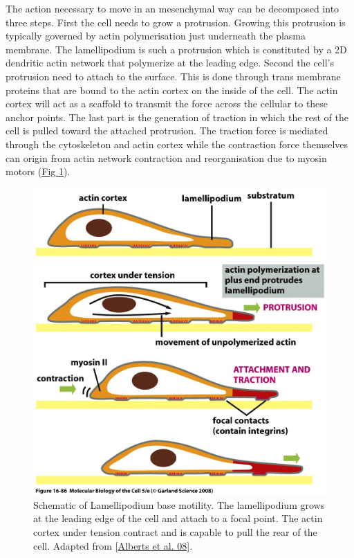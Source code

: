 \documentclass[A4paperpaper,11pt,english]{sphinxmanual}
\begin{document}
The action necessary to move in an mesenchymal way can be decomposed into three
steps. First the cell needs to grow a protrusion. Growing this protrusion is
typically governed by actin polymerisation just underneath the plasma membrane. The
lamellipodium is such a protrusion which is constituted by a 2D dendritic actin network
that polymerize at the leading edge. Second the cell's protrusion
need to attach to the surface. This is done through trans membrane proteins
that are bound to the actin cortex on the inside of the cell. The actin cortex
will act as a scaffold to transmit the force across the cellular to these
anchor points. The last part is the generation of traction in which the rest of the cell is pulled
toward the attached protrusion. The traction force is mediated through the
cytoskeleton and actin cortex while the contraction force themselves can origin
from actin network contraction and reorganisation due to myosin motors (\hyperref[index-latex:fig-lam-principle]{Fig  \ref*{index-latex:fig-lam-principle}}).
\begin{figure}[htbp]
\centering
\capstart

\includegraphics[width=0.900\linewidth]{figure-16-86.jpg}
\caption{Schematic of Lamellipodium base motility. The lamellipodium grows at the
leading edge of the cell and attach to a focal point. The actin cortex
under tension contract and is capable to pull the rear of the cell. Adapted
from {\hyperref[index-latex:alberts2008]{{[}Alberts et al. 08{]}}}.}\label{index-latex:fig-lam-principle}\end{figure}
\end{document}
